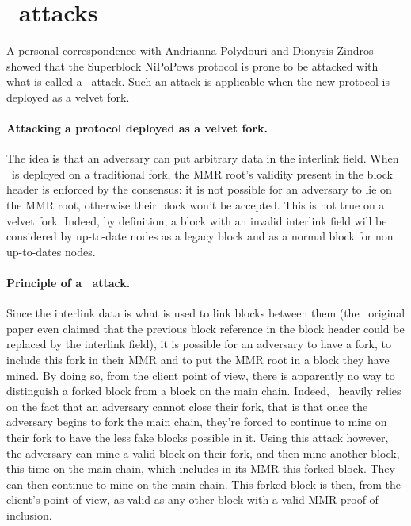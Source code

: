     \section{\CS\ attacks}
      A personal correspondence with Andrianna Polydouri and Dionysis Zindros showed that the Superblock NiPoPows protocol is prone to be attacked with what is called a \cs\ attack. Such an attack is applicable when the new protocol is deployed as a velvet fork.
      
      \paragraph{Attacking a protocol deployed as a velvet fork.} The idea is that an adversary can put arbitrary data in the interlink field. When \FC\ is deployed on a traditional fork, the MMR root's validity present in the block header is enforced by the consensus: it is not possible for an adversary to lie on the MMR root, otherwise their block won't be accepted. This is not true on a velvet fork. Indeed, by definition, a block with an invalid interlink field will be considered by up-to-date nodes as a legacy block and as a normal block for non up-to-dates nodes.
      
      \paragraph{Principle of a \cs\ attack.} Since the interlink data is what is used to link blocks between them (the \FC\ original paper even claimed that the previous block reference in the block header could be replaced by the interlink field), it is possible for an adversary to have a fork, to include this fork in their MMR and to put the MMR root in a block they have mined. By doing so, from the client point of view, there is apparently no way to distinguish a forked block from a block on the main chain. Indeed, \FC\ heavily relies on the fact that an adversary cannot close their fork, that is that once the adversary begins to fork the main chain, they're forced to continue to mine on their fork to have the less fake blocks possible in it. Using this attack however, the adversary can mine a valid block on their fork, and then mine another block, this time on the main chain, which includes in its MMR this forked block. They can then continue to mine on the main chain. This forked block is then, from the client's point of view, as valid as any other block with a valid MMR proof of inclusion.
      
